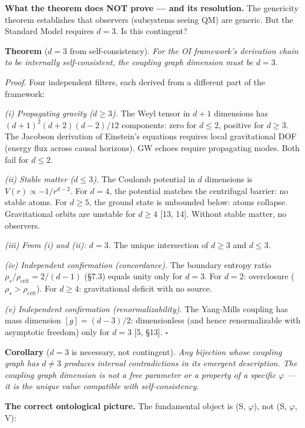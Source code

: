 \documentclass[
  11pt,
]{article}
\begin{document}
\textbf{What the theorem does NOT prove --- and its resolution.} The
genericity theorem establishes that observers (subsystems seeing QM) are
generic. But the Standard Model requires \(d = 3\). Is this contingent?

\textbf{Theorem} (\(d = 3\) from self-consistency). \emph{For the OI
framework's derivation chain to be internally self-consistent, the
coupling graph dimension must be \(d = 3\).}

\emph{Proof.} Four independent filters, each derived from a different
part of the framework:

\emph{(i) Propagating gravity (\(d \geq 3\)).} The Weyl tensor in
\(d+1\) dimensions has \((d+1)^2(d+2)(d-2)/12\) components: zero for
\(d \leq 2\), positive for \(d \geq 3\). The Jacobson derivation of
Einstein's equations requires local gravitational DOF (energy flux
across causal horizons). GW echoes require propagating modes. Both fail
for \(d \leq 2\).

\emph{(ii) Stable matter (\(d \leq 3\)).} The Coulomb potential in \(d\)
dimensions is \(V(r) \propto -1/r^{d-2}\). For \(d = 4\), the potential
matches the centrifugal barrier: no stable atoms. For \(d \geq 5\), the
ground state is unbounded below: atoms collapse. Gravitational orbits
are unstable for \(d \geq 4\) {[}13, 14{]}. Without stable matter, no
observers.

\emph{(iii) From (i) and (ii): \(d = 3\).} The unique intersection of
\(d \geq 3\) and \(d \leq 3\).

\emph{(iv) Independent confirmation (concordance).} The boundary entropy
ratio \(\rho_s/\rho_{\text{crit}} = 2/(d-1)\) (§7.3) equals unity only
for \(d = 3\). For \(d = 2\): overclosure
(\(\rho_s > \rho_{\text{crit}}\)). For \(d \geq 4\): gravitational
deficit with no source.

\emph{(v) Independent confirmation (renormalizability).} The Yang-Mills
coupling has mass dimension \([g] = (d-3)/2\): dimensionless (and hence
renormalizable with asymptotic freedom) only for \(d = 3\) {[}5, §13{]}.
\(\square\)

\textbf{Corollary} (\(d = 3\) is necessary, not contingent). \emph{Any
bijection whose coupling graph has \(d \neq 3\) produces internal
contradictions in its emergent description. The coupling graph dimension
is not a free parameter or a property of a specific \(\varphi\) --- it
is the unique value compatible with self-consistency.}

\textbf{The correct ontological picture.} The fundamental object is (S,
\(\varphi\)), not (S, \(\varphi\), V):
\end{document}
